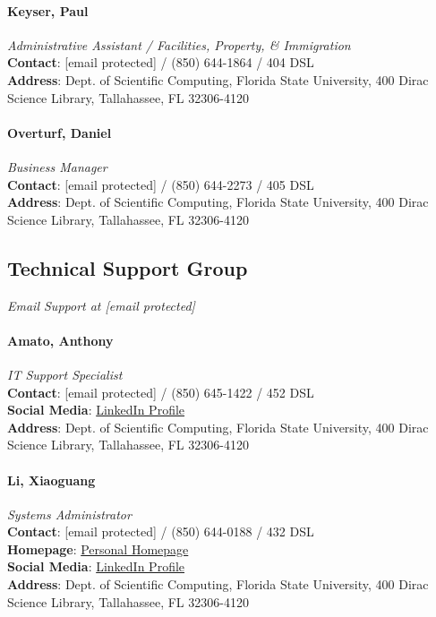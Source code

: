 \documentclass[12pt,a4paper]{article}
\begin{document}
\paragraph{Keyser, Paul}
\textit{Administrative Assistant / Facilities, Property, \& Immigration}\\
\textbf{Contact}: [email protected] / (850) 644-1864 / 404 DSL\\
\textbf{Address}: Dept. of Scientific Computing, Florida State University, 400 Dirac Science Library, Tallahassee, FL 32306-4120

\paragraph{Overturf, Daniel}
\textit{Business Manager}\\
\textbf{Contact}: [email protected] / (850) 644-2273 / 405 DSL\\
\textbf{Address}: Dept. of Scientific Computing, Florida State University, 400 Dirac Science Library, Tallahassee, FL 32306-4120

\subsection{Technical Support Group}
\textit{Email Support at [email protected]}

\paragraph{Amato, Anthony}
\textit{IT Support Specialist}\\
\textbf{Contact}: [email protected] / (850) 645-1422 / 452 DSL\\
\textbf{Social Media}: \href{https://www.linkedin.com/in/anthony-amato-844438186/}{LinkedIn Profile}\\
\textbf{Address}: Dept. of Scientific Computing, Florida State University, 400 Dirac Science Library, Tallahassee, FL 32306-4120

\paragraph{Li, Xiaoguang}
\textit{Systems Administrator}\\
\textbf{Contact}: [email protected] / (850) 644-0188 / 432 DSL\\
\textbf{Homepage}: \href{http://people.sc.fsu.edu/~xli3/}{Personal Homepage}\\
\textbf{Social Media}: \href{https://www.linkedin.com/in/xiaoguang-li-9243729/}{LinkedIn Profile}\\
\textbf{Address}: Dept. of Scientific Computing, Florida State University, 400 Dirac Science Library, Tallahassee, FL 32306-4120
\end{document}
